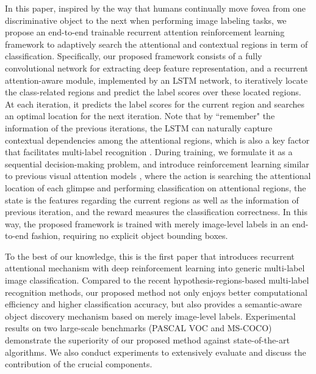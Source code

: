 \documentclass[letterpaper]{article} %
\begin{document}
In this paper, inspired by the way that humans continually move fovea from one discriminative object to the next when performing image labeling tasks, we propose an end-to-end trainable recurrent attention reinforcement learning framework to adaptively search the attentional and contextual regions in term of classification. Specifically, our proposed framework consists of a fully convolutional network for extracting deep feature representation, and a recurrent attention-aware module, implemented by an LSTM network, to iteratively locate the class-related regions and predict the label scores over these located regions. At each iteration, it predicts the label scores for the current region and searches an optimal location for the next iteration. Note that by ``remember" the information of the previous iterations, the LSTM can naturally capture contextual dependencies among the attentional regions, which is also a key factor that facilitates multi-label recognition \cite{zhang2016multi}. During training, we formulate it as a sequential decision-making problem, and introduce reinforcement learning similar to previous visual attention models \cite{mnih2014recurrent,ba2014multiple}, where the action is searching the attentional location of each glimpse and performing classification on attentional regions, the state is the features regarding the current regions as well as the information of previous iteration, and the reward measures the classification correctness. In this way, the proposed framework is trained with merely image-level labels in an end-to-end fashion, requiring no explicit object bounding boxes.

To the best of our knowledge, this is the first paper that introduces recurrent attentional mechanism with deep reinforcement learning into generic multi-label image classification. Compared to the recent hypothesis-regions-based multi-label recognition methods, our proposed method not only enjoys better computational efficiency and higher classification accuracy, but also provides a semantic-aware object discovery mechanism based on merely image-level labels. Experimental results on two large-scale benchmarks (PASCAL VOC and MS-COCO) demonstrate the superiority of our proposed method against state-of-the-art algorithms. We also conduct experiments to extensively evaluate and discuss the contribution of the crucial components.
\end{document}
